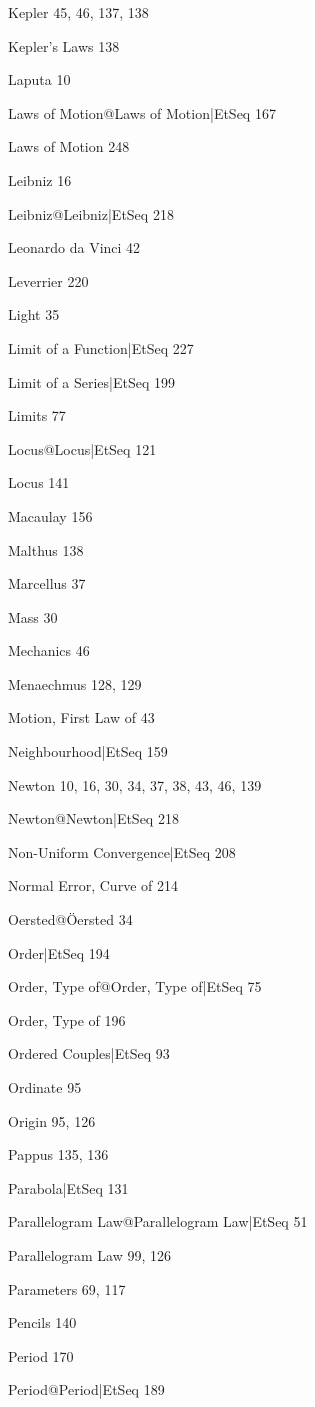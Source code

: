 \documentclass[12pt,leqno]{book}[2005/09/16]
\begin{document}
Kepler 45, 46, 137, 138

Kepler's Laws 138

Laputa 10

Laws of Motion@Laws of Motion|EtSeq 167

Laws of Motion 248

Leibniz 16

Leibniz@Leibniz|EtSeq 218

Leonardo da Vinci 42

Leverrier 220

Light 35

Limit of a Function|EtSeq 227

Limit of a Series|EtSeq 199

Limits 77

Locus@Locus|EtSeq 121

Locus 141

Macaulay 156

Malthus 138

Marcellus 37

Mass 30

Mechanics 46

Menaechmus 128, 129

Motion, First Law of 43

Neighbourhood|EtSeq 159

Newton 10, 16, 30, 34, 37, 38, 43, 46, 139

Newton@Newton|EtSeq 218

Non-Uniform Convergence|EtSeq 208

Normal Error, Curve of 214

Oersted@Öersted 34

Order|EtSeq 194

Order, Type of@Order, Type of|EtSeq 75

Order, Type of 196

Ordered Couples|EtSeq 93

Ordinate 95

Origin 95, 126

Pappus 135, 136

Parabola|EtSeq 131

Parallelogram Law@Parallelogram Law|EtSeq 51

Parallelogram Law 99, 126

Parameters 69, 117

Pencils 140

Period 170

Period@Period|EtSeq 189
\end{document}
